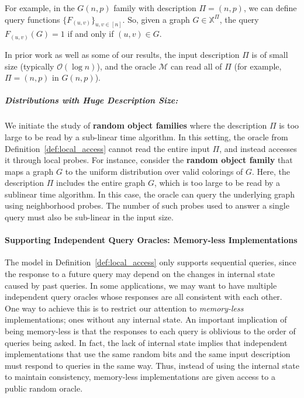 For example, in the $G(n,p)$ family with description $\Pi = (n, p)$,
we can define  query functions $\{ F_{(u,v)}\}_{u,v\in [n]}$.
So, given a graph $G\in \mathbb X^{\Pi}$, the query $F_{(u,v)}(G) = 1$ if and only if $(u,v)\in G$.

In prior work \cite{reut, huge, sparse} as well as some of our results, the input description $\Pi$ is of small size (typically $\mathcal O(\log n)$),
and the oracle $\mathcal M$ can read all of $\Pi$ (for example, $\Pi = (n, p)$ in $G(n,p)$).

\subparagraph*{Distributions with Huge Description Size:}
\label{par:distributions_with_huge_description_size}
We initiate the study of \textbf{random object families} where the description $\Pi$ is too large to be read by a sub-linear time algorithm.
In this setting, the oracle from Definition~\ref{def:local_access} cannot read the entire input $\Pi$, and instead accesses it through local probes.
For instance, consider the \textbf{random object family} that maps a graph $G$ to the uniform distribution over valid colorings of $G$.
Here, the description $\Pi$ includes the entire graph $G$, which is too large to be read by a sublinear time algorithm.
In this case, the oracle can query the underlying graph using neighborhood probes.
The number of such probes used to answer a single query must also be sub-linear in the input size.


\paragraph*{Supporting Independent Query Oracles: Memory-less Implementations}
\label{par:supporting_independent_query_oracles_memory_less_implementations}
The model in Definition~\ref{def:local_access} only supports sequential queries,
since the response to a future query may depend on the changes in internal state caused by past queries.
In some applications, we may want to have multiple independent query oracles whose responses are all consistent with each other.
One way to achieve this is to restrict our attention to \emph{memory-less} implementations; ones without any internal state.
An important implication of being memory-less is that the responses to each query is oblivious to the order of queries being asked.
In fact, the lack of internal state implies that independent implementations that use the same random bits and the same input description
must respond to queries in the same way.
Thus, instead of using the internal state to maintain consistency, memory-less implementations are given access to a public random oracle.

